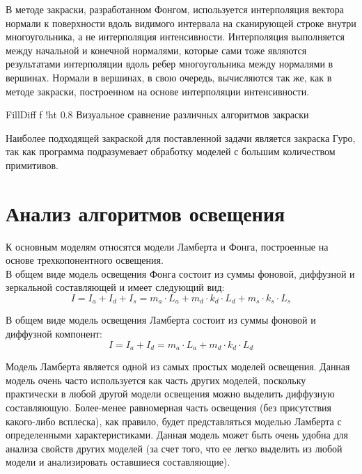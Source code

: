 \leavevmode

В методе закраски, разработанном Фонгом, используется интерполяция вектора нормали к поверхности вдоль видимого интервала на сканирующей строке внутри многоугольника, а не интерполяция интенсивности. Интерполяция выполняется между начальной и конечной нормалями, которые сами тоже являются результатами интерполяции вдоль ребер многоугольника между нормалями в вершинах. Нормали в вершинах, в свою очередь, вычисляются так же, как в методе закраски, построенном на основе интерполяции интенсивности. \cite{FILL_FACES}

{FillDiff}
{f}
{!ht}
{0.8\textwidth}
{Визуальное сравнение различных алгоритмов закраски}

Наиболее подходящей закраской для поставленной задачи является закраска Гуро, так как программа подразумевает обработку моделей с большим количеством примитивов.

\newpage

\section{Анализ алгоритмов освещения}

К основным моделям относятся модели Ламберта и Фонга, построенные на основе трехкопонентного освещения.\\

В общем виде модель освещения Фонга состоит из суммы фоновой, диффузной и зеркальной составляющей и имеет следующий вид:
\begin{equation}
	I = I_{a} + I_{d} + I_{s} = m_{a} \cdot L_{a} + m_{d} \cdot k_{d} \cdot L_{d} + m_{s} \cdot k_{s} \cdot L_{s}
\end{equation}

\leavevmode

В общем виде модель освещения Ламберта состоит из суммы фоновой и диффузной компонент:
\begin{equation}
	I = I_{a} + I_{d} = m_{a} \cdot L_{a} + m_{d} \cdot k_{d} \cdot L_{d}
\end{equation}

Модель Ламберта является одной из самых простых моделей освещения. Данная модель очень часто используется как часть других моделей, поскольку практически в любой другой модели освещения можно выделить диффузную составляющую. Более-менее равномерная часть освещения (без присутствия какого-либо всплеска), как правило, будет представляться моделью Ламберта с определенными характеристиками. Данная модель может быть очень удобна для анализа свойств других моделей (за счет того, что ее легко выделить из любой модели и анализировать оставшиеся составляющие).

